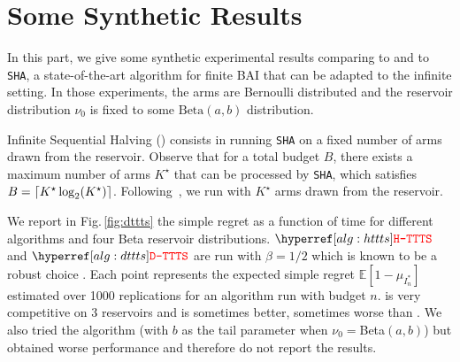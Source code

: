 \section{Some Synthetic Results}\label{app:dttts.experiments}
In this part, we give some synthetic experimental results comparing \DTTTS to \Hyperband and to \texttt{SHA}, a state-of-the-art algorithm for finite BAI that can be adapted to the infinite setting. In those experiments, the arms are Bernoulli distributed and the reservoir distribution $\nu_0$ is fixed to some $\text{Beta}(a,b)$ distribution. 

Infinite Sequential Halving (\ISHA) consists in running \texttt{SHA} on a fixed number of arms drawn from the reservoir. Observe that for a total budget $B$, there exists a maximum number of arms $K^\star$ that can be processed by \texttt{SHA}, which satisfies $B = \lceil K^\star\log_2(K^\star)\rceil$. Following~\cite{aziz2018infinite}, we run \ISHA with $K^\star$ arms drawn from the reservoir. %

We report in Fig.\,\ref{fig:dttts} the simple regret as a function of time for different algorithms and four Beta reservoir distributions. $\HTTTS$ and $\DTTTS$ are run with $\beta=1/2$ which is known to be a robust choice \citep{russo2016ttts}. Each point represents the expected simple regret $\mathbb{E}[1 - \mu_{I_n^*}]$ estimated over 1000 replications for an algorithm run with budget $n$. \DTTTS is very competitive on 3 reservoirs and \HTTTS is sometimes better, sometimes worse than \Hyperband. We also tried the \SiRI algorithm \citep{carpentier2015siri} (with $b$ as the tail parameter when $\nu_0=$Beta$(a,b)$) but obtained worse performance and therefore do not report the results.

